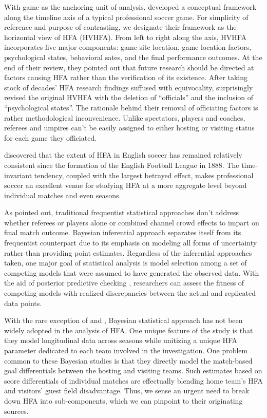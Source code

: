 \documentclass[USenglish]{article}
\begin{document}
With game as the anchoring unit of analysis, \cite{Courneya1992} developed a conceptual framework along the timeline axis of a typical professional soccer game. For simplicity of reference and purpose of contrasting, we designate their framework as the horizontal view of HFA (HVHFA). From left to right along the axis, HVHFA incorporates five major components: game site location, game location factors, psychological states, behavioral sates, and the final performance outcomes. At the end of their review, they pointed out that future research should be directed at factors causing HFA rather than the verification of its existence. After taking stock of decades' HFA research findings suffused with equivocality, \cite{Carron2005} surprisingly revised the original HVHFA with the deletion of ``officials'' and the inclusion of ``psychological states''. The rationale behind their removal of officiating factors is rather methodological inconvenience. Unlike spectators, players and coaches, referees and umpires can't be easily assigned to either hosting or visiting status for each game they officiated. 


\cite{Pollard1986} discovered that the extent of HFA in English soccer has remained relatively consistent since the formation of the English Football League in 1888. The time-invariant tendency, coupled with the largest betrayed effect, makes professional soccer an excellent venue for studying HFA at a more aggregate level beyond individual matches and even seasons. 

 

As \cite{Boyko2007} pointed out, traditional frequentist statistical approaches don't address whether referees or players alone or combined channel crowd effects to impart on final match outcome. Bayesian inferential approach separates itself from its frequentist counterpart due to its emphasis on modeling all forms of uncertainty rather than providing point estimates. Regardless of the inferential approaches taken, one major goal of statistical analysis is model selection among a set of competing models that were assumed to have generated the observed data. With the aid of posterior predictive checking \citep{Gelman1996}, researchers can assess the fitness of competing models with realized discrepancies between the actual and replicated data points. 

With the rare exception of \cite{Gajewski2006} and \cite{Glickman1998, Glickman2005}, Bayesian statistical approach has not been widely adopted in the analysis of HFA. One unique feature of the \cite{Gajewski2006} study is that they model longitudinal data across seasons while unitizing a unique HFA parameter dedicated to each team involved in the investigation. One problem common to these Bayesian studies is that they directly model the match-based goal differentials between the hosting and visiting teams. Such estimates based on score differentials of individual matches are effectually  blending home team's HFA and visitors' guest field disadvantage. Thus, we sense an urgent need to break down HFA into sub-components, which we can pinpoint to their originating sources.    
\end{document}
